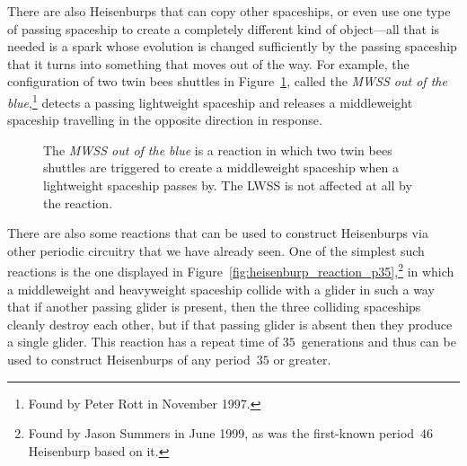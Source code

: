 There are also Heisenburps that can copy other spaceships, or even use one type of passing spaceship to create a completely different kind of object---all that is needed is a spark whose evolution is changed sufficiently by the passing spaceship that it turns into something that moves out of the way. For example, the configuration of two twin bees shuttles in Figure~\ref{fig:mwss_out_of_the_blue}, called the \emph{MWSS out of the blue},\footnote{Found by Peter Rott in November 1997.} detects a passing lightweight spaceship and releases a middleweight spaceship travelling in the opposite direction in response.

\begin{figure}[!htb]
	\centering
	\caption{The \emph{MWSS out of the blue} is a reaction in which two twin bees shuttles are triggered to create a middleweight spaceship when a lightweight spaceship passes by. The LWSS is not affected at all by the reaction.}\label{fig:mwss_out_of_the_blue}
\end{figure}

There are also some reactions that can be used to construct Heisenburps via other periodic circuitry that we have already seen. One of the simplest such reactions is the one displayed in Figure~\ref{fig:heisenburp_reaction_p35},\footnote{Found by Jason Summers in June 1999, as was the first-known period~$46$ Heisenburp based on it.} in which a middleweight and heavyweight spaceship collide with a glider in such a way that if another passing glider is present, then the three colliding spaceships cleanly destroy each other, but if that passing glider is absent then they produce a single glider. This reaction has a repeat time of $35$~generations and thus can be used to construct Heisenburps of any period~$35$ or greater.

